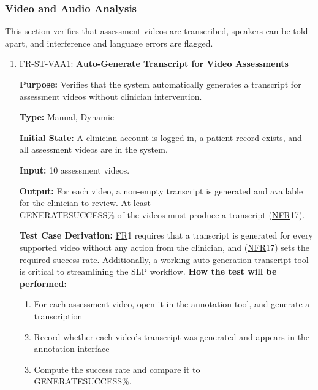 \documentclass[12pt, titlepage]{article}
\newcommand{\srsfr}[1]{\href{https://github.com/Nour-Fawaz/MacaBoca/blob/main/pdfs/SRS/SRS.pdf}{FR}}
\newcommand{\srsnfr}[1]{\href{https://github.com/Nour-Fawaz/MacaBoca/blob/main/pdfs/SRS/SRS.pdf}{NFR}}
\renewcommand{\_}{\oldunderscore\allowbreak}
\begin{document}
\subsubsection{Video and Audio Analysis}
This section verifies that assessment videos are transcribed, speakers can be told apart, and interference and language errors are flagged.
\begin{enumerate}
  \item FR-ST-VAA1: \textbf{Auto-Generate Transcript for Video Assessments\\}
  \begin{mdframed}[linewidth=0.5mm]
      \textbf{Purpose:} Verifies that the system automatically generates a transcript for assessment videos without clinician intervention.\par
      \textbf{Type:} Manual, Dynamic \par
      \textbf{Initial State:} A clinician account is logged in, a patient record exists, and all assessment videos are in the system. \par
      \textbf{Input:} 10 assessment videos. \par
      \textbf{Output:} For each video, a non-empty transcript is generated and available for the clinician to review. At least \\GENERATE\_SUCCESS\% of the videos must produce a transcript (\srsnfr*{17}). \par
      \textbf{Test Case Derivation:} \srsfr*{1} requires that a transcript is generated for every supported video without any action from the clinician, and (\srsnfr*{17}) sets the required success rate. Additionally, a working auto-generation transcript tool is critical to streamlining the SLP workflow.
      \textbf{How the test will be performed:}
      \begin{enumerate}
          \item[1.] For each assessment video, open it in the annotation tool, and generate a transcription
          \item[2.] Record whether each video's transcript was generated and appears in the annotation interface
          \item[3.] Compute the success rate and compare it to \\ GENERATE\_SUCCESS\%.
      \end{enumerate}
  \end{mdframed}


\end{enumerate}
\end{document}
